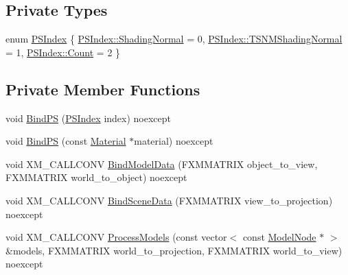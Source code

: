 \subsection*{Private Types}
\begin{DoxyCompactItemize}
\item 
enum \hyperlink{classmage_1_1_shading_normal_pass_a6d277753d26a7854c448b3e0d9275b19}{P\+S\+Index} \{ \hyperlink{classmage_1_1_shading_normal_pass_a6d277753d26a7854c448b3e0d9275b19a3e798a25c7282d23599b6b994f8b4bfd}{P\+S\+Index\+::\+Shading\+Normal} = 0, 
\hyperlink{classmage_1_1_shading_normal_pass_a6d277753d26a7854c448b3e0d9275b19a145dd25767d970e1e07b749c9e21af9b}{P\+S\+Index\+::\+T\+S\+N\+M\+Shading\+Normal} = 1, 
\hyperlink{classmage_1_1_shading_normal_pass_a6d277753d26a7854c448b3e0d9275b19ae93f994f01c537c4e2f7d8528c3eb5e9}{P\+S\+Index\+::\+Count} = 2
 \}
\end{DoxyCompactItemize}
\subsection*{Private Member Functions}
\begin{DoxyCompactItemize}
\item 
void \hyperlink{classmage_1_1_shading_normal_pass_ab691c2125f9e21c7e70f2737037504bc}{Bind\+PS} (\hyperlink{classmage_1_1_shading_normal_pass_a6d277753d26a7854c448b3e0d9275b19}{P\+S\+Index} index) noexcept
\item 
void \hyperlink{classmage_1_1_shading_normal_pass_af8ef8987bda86646712780b5cfad0b72}{Bind\+PS} (const \hyperlink{structmage_1_1_material}{Material} $\ast$material) noexcept
\item 
void X\+M\+\_\+\+C\+A\+L\+L\+C\+O\+NV \hyperlink{classmage_1_1_shading_normal_pass_abbcc01b6d2e747ffd35bc5a69483db65}{Bind\+Model\+Data} (F\+X\+M\+M\+A\+T\+R\+IX object\+\_\+to\+\_\+view, F\+X\+M\+M\+A\+T\+R\+IX world\+\_\+to\+\_\+object) noexcept
\item 
void X\+M\+\_\+\+C\+A\+L\+L\+C\+O\+NV \hyperlink{classmage_1_1_shading_normal_pass_a738ec6bb32a6ba30265010d971c8c0cf}{Bind\+Scene\+Data} (F\+X\+M\+M\+A\+T\+R\+IX view\+\_\+to\+\_\+projection) noexcept
\item 
void X\+M\+\_\+\+C\+A\+L\+L\+C\+O\+NV \hyperlink{classmage_1_1_shading_normal_pass_ab760947cd91e5b05cdf2bacbad0b60e1}{Process\+Models} (const vector$<$ const \hyperlink{classmage_1_1_model_node}{Model\+Node} $\ast$ $>$ \&models, F\+X\+M\+M\+A\+T\+R\+IX world\+\_\+to\+\_\+projection, F\+X\+M\+M\+A\+T\+R\+IX world\+\_\+to\+\_\+view) noexcept
\end{DoxyCompactItemize}
